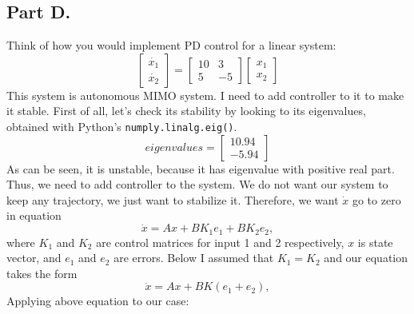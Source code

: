 \documentclass[a4paper,12pt]{article}
\begin{document}
    \subsection*{Part D.}
    Think of how you would implement PD control for a linear system:
    \begin{equation*}
        \begin{bmatrix}
            \dot{x_1}\\
            \dot{x_2}
        \end{bmatrix}
        = 
        \begin{bmatrix}
            10 & 3 \\
            5 & -5
        \end{bmatrix}
        \begin{bmatrix}
            x_1\\
            x_2
        \end{bmatrix}
    \end{equation*}
    This system is autonomous MIMO system. I need to add controller to it to 
    make it stable. First of all, let's check its stability by looking to its 
    eigenvalues, obtained with Python's \texttt{numply.linalg.eig()}.
    \begin{equation*}
        eigenvalues = 
        \begin{bmatrix}
            10.94\\
            -5.94
        \end{bmatrix}
    \end{equation*}
    As can be seen, it is unstable, because it has eigenvalue with positive
    real part. Thus, we need to add controller to the system. We do not want our 
    system to keep any trajectory, we just want to stabilize it. Therefore, we 
    want $\dot{x}$ go to zero in equation
    \begin{equation*}
        \dot{x} = Ax + BK_1e_1 + BK_2e_2,
    \end{equation*}
    where $K_1$ and $K_2$ are control matrices for input 1 and 2 respectively,
    $x$ is state vector, and $e_1$ and $e_2$ are errors. Below I assumed that 
    $K_1 = K_2$ and our equation takes the form
    \begin{equation*}
        \dot{x} = Ax + BK(e_1 + e_2),
    \end{equation*}
    Applying above equation to our case:
\end{document}

